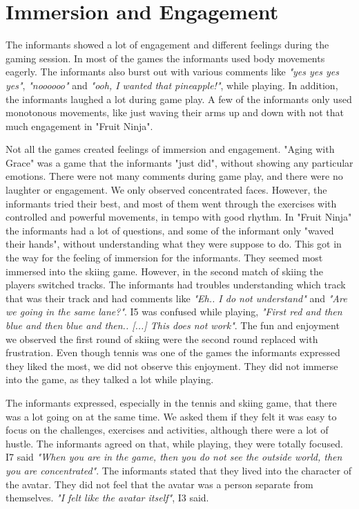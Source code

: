 \section{Immersion and Engagement}
The informants showed a lot of engagement and different feelings during the gaming session. In most of the games the informants used body movements eagerly. The informants also burst out with various comments like \emph{"yes yes yes yes"}, \emph{"noooooo"} and \emph{"ooh, I wanted that pineapple!"}, while playing. In addition, the informants laughed a lot during game play. A few of the informants only used monotonous movements, like just waving their arms up and down with not that much engagement in "Fruit Ninja".  

Not all the games created feelings of immersion and engagement. "Aging with Grace" was a game that the informants "just did", without showing any particular emotions. There were not many comments during game play, and there were no laughter or engagement. We only observed concentrated faces. However, the informants tried their best, and most of them went through the exercises with controlled and powerful movements, in tempo with good rhythm. In "Fruit Ninja" the informants had a lot of questions, and some of the informant only "waved their hands", without understanding what they were suppose to do. This got in the way for the feeling of immersion for the informants. They seemed most immersed into the skiing game. However, in the second match of skiing the players switched tracks. The informants had troubles understanding which track that was their track and had comments like \emph{"Eh.. I do not understand"} and \emph{"Are we going in the same lane?"}. I5 was confused while playing, \emph{"First red and then blue and then blue and then.. [...] This does not work"}. The fun and enjoyment we observed the first round of skiing were the second round replaced with frustration. Even though tennis was one of the games the informants expressed they liked the most, we did not observe this enjoyment. They did not immerse into the game, as they talked a lot while playing. 

The informants expressed, especially in the tennis and skiing game, that there was a lot going on at the same time. We asked them if they felt it was easy to focus on the challenges, exercises and activities, although there were a lot of hustle. The informants agreed on that, while playing, they were totally focused. I7 said \emph{"When you are in the game, then you do not see the outside world, then you are concentrated"}. The informants stated that they lived into the character of the avatar. They did not feel that the avatar was a person separate from themselves. \emph{"I felt like the avatar itself"}, I3 said. 

